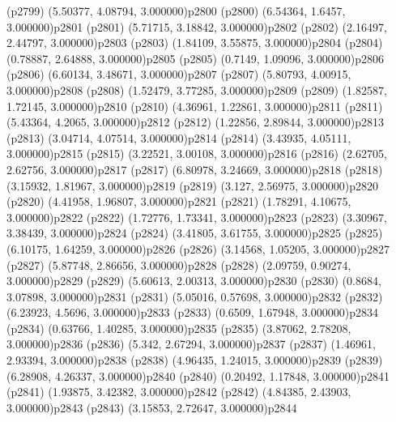 \psdot(p2799)
\psPoint(5.50377, 4.08794, 3.000000){p2800}
\psdot(p2800)
\psPoint(6.54364, 1.6457, 3.000000){p2801}
\psdot(p2801)
\psPoint(5.71715, 3.18842, 3.000000){p2802}
\psdot(p2802)
\psPoint(2.16497, 2.44797, 3.000000){p2803}
\psdot(p2803)
\psPoint(1.84109, 3.55875, 3.000000){p2804}
\psdot(p2804)
\psPoint(0.78887, 2.64888, 3.000000){p2805}
\psdot(p2805)
\psPoint(0.7149, 1.09096, 3.000000){p2806}
\psdot(p2806)
\psPoint(6.60134, 3.48671, 3.000000){p2807}
\psdot(p2807)
\psPoint(5.80793, 4.00915, 3.000000){p2808}
\psdot(p2808)
\psPoint(1.52479, 3.77285, 3.000000){p2809}
\psdot(p2809)
\psPoint(1.82587, 1.72145, 3.000000){p2810}
\psdot(p2810)
\psPoint(4.36961, 1.22861, 3.000000){p2811}
\psdot(p2811)
\psPoint(5.43364, 4.2065, 3.000000){p2812}
\psdot(p2812)
\psPoint(1.22856, 2.89844, 3.000000){p2813}
\psdot(p2813)
\psPoint(3.04714, 4.07514, 3.000000){p2814}
\psdot(p2814)
\psPoint(3.43935, 4.05111, 3.000000){p2815}
\psdot(p2815)
\psPoint(3.22521, 3.00108, 3.000000){p2816}
\psdot(p2816)
\psPoint(2.62705, 2.62756, 3.000000){p2817}
\psdot(p2817)
\psPoint(6.80978, 3.24669, 3.000000){p2818}
\psdot(p2818)
\psPoint(3.15932, 1.81967, 3.000000){p2819}
\psdot(p2819)
\psPoint(3.127, 2.56975, 3.000000){p2820}
\psdot(p2820)
\psPoint(4.41958, 1.96807, 3.000000){p2821}
\psdot(p2821)
\psPoint(1.78291, 4.10675, 3.000000){p2822}
\psdot(p2822)
\psPoint(1.72776, 1.73341, 3.000000){p2823}
\psdot(p2823)
\psPoint(3.30967, 3.38439, 3.000000){p2824}
\psdot(p2824)
\psPoint(3.41805, 3.61755, 3.000000){p2825}
\psdot(p2825)
\psPoint(6.10175, 1.64259, 3.000000){p2826}
\psdot(p2826)
\psPoint(3.14568, 1.05205, 3.000000){p2827}
\psdot(p2827)
\psPoint(5.87748, 2.86656, 3.000000){p2828}
\psdot(p2828)
\psPoint(2.09759, 0.90274, 3.000000){p2829}
\psdot(p2829)
\psPoint(5.60613, 2.00313, 3.000000){p2830}
\psdot(p2830)
\psPoint(0.8684, 3.07898, 3.000000){p2831}
\psdot(p2831)
\psPoint(5.05016, 0.57698, 3.000000){p2832}
\psdot(p2832)
\psPoint(6.23923, 4.5696, 3.000000){p2833}
\psdot(p2833)
\psPoint(0.6509, 1.67948, 3.000000){p2834}
\psdot(p2834)
\psPoint(0.63766, 1.40285, 3.000000){p2835}
\psdot(p2835)
\psPoint(3.87062, 2.78208, 3.000000){p2836}
\psdot(p2836)
\psPoint(5.342, 2.67294, 3.000000){p2837}
\psdot(p2837)
\psPoint(1.46961, 2.93394, 3.000000){p2838}
\psdot(p2838)
\psPoint(4.96435, 1.24015, 3.000000){p2839}
\psdot(p2839)
\psPoint(6.28908, 4.26337, 3.000000){p2840}
\psdot(p2840)
\psPoint(0.20492, 1.17848, 3.000000){p2841}
\psdot(p2841)
\psPoint(1.93875, 3.42382, 3.000000){p2842}
\psdot(p2842)
\psPoint(4.84385, 2.43903, 3.000000){p2843}
\psdot(p2843)
\psPoint(3.15853, 2.72647, 3.000000){p2844}
